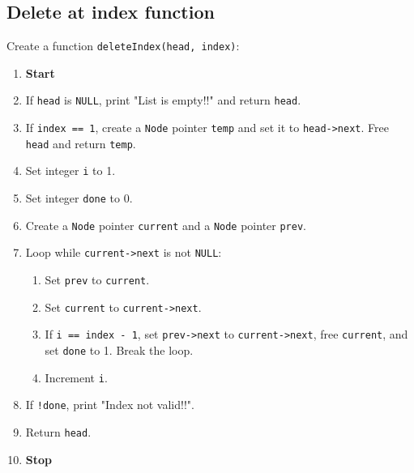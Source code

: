 {  \subsection{Delete at index function}
  Create a function \texttt{deleteIndex(head, index)}:
  \begin{enumerate}[label=\arabic*:,left=0pt]
    \item \textbf{Start}
    \item If \texttt{head} is \texttt{NULL}, print "List is empty!!" and return \texttt{head}.
    \item If \texttt{index == 1}, create a \texttt{Node} pointer \texttt{temp} and set it to \texttt{head->next}. Free \texttt{head} and return \texttt{temp}.
    \item Set integer \texttt{i} to 1.
    \item Set integer \texttt{done} to 0.
    \item Create a \texttt{Node} pointer \texttt{current} and a \texttt{Node} pointer \texttt{prev}.
    \item Loop while \texttt{current->next} is not \texttt{NULL}:
          \begin{enumerate}[label=2.\arabic*:, start=1]
            \item Set \texttt{prev} to \texttt{current}.
            \item Set \texttt{current} to \texttt{current->next}.
            \item If \texttt{i == index - 1}, set \texttt{prev->next} to \texttt{current->next}, free \texttt{current}, and set \texttt{done} to 1. \newline Break the loop.
            \item Increment \texttt{i}.
          \end{enumerate}
    \item If \texttt{!done}, print "Index not valid!!".
    \item Return \texttt{head}.
    \item \textbf{Stop}
  \end{enumerate}

}
